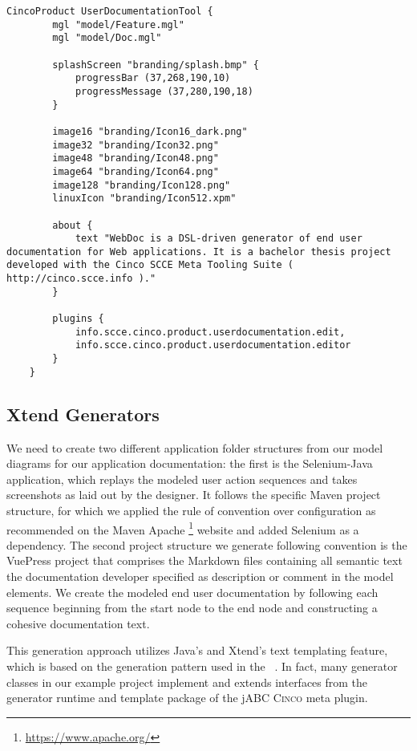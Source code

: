\begin{lstlisting}[language=MGL, caption={UserDocumentationTool.cpd}]
    CincoProduct UserDocumentationTool {
        mgl "model/Feature.mgl"
        mgl "model/Doc.mgl"
        
        splashScreen "branding/splash.bmp" {
            progressBar (37,268,190,10)
            progressMessage (37,280,190,18)
        }
    
        image16 "branding/Icon16_dark.png"
        image32 "branding/Icon32.png"
        image48 "branding/Icon48.png"
        image64 "branding/Icon64.png"
        image128 "branding/Icon128.png"
        linuxIcon "branding/Icon512.xpm"
	
        about {
            text "WebDoc is a DSL-driven generator of end user documentation for Web applications. It is a bachelor thesis project developed with the Cinco SCCE Meta Tooling Suite ( http://cinco.scce.info )."
        }

        plugins {
            info.scce.cinco.product.userdocumentation.edit,
            info.scce.cinco.product.userdocumentation.editor
        }
    }
\end{lstlisting}

\subsection{Xtend Generators}\label{sec:GEN}

We need to create two different application folder structures from our model diagrams for our application documentation: the first is the Selenium-Java application, which replays the modeled user action sequences and takes screenshots as laid out by the designer. It follows the specific Maven project structure, for which we applied the rule of convention over configuration as recommended on the Maven Apache \footnote[1]{\url{https://www.apache.org/}} website and added Selenium as a dependency. The second project structure we generate following convention is the VuePress project that comprises the Markdown files containing all semantic text the documentation developer specified as description or comment in the model elements. We create the modeled end user documentation by following each sequence beginning from the start node to the end node and constructing a cohesive documentation text.

This generation approach utilizes Java's and Xtend's text templating feature, which is based on the generation pattern used in the ~\cite{model-driver-dev_jABC,jabc-home}. In fact, many generator classes in our example project implement and extends interfaces from the generator runtime and template package of the jABC \textsc{Cinco} meta plugin.

